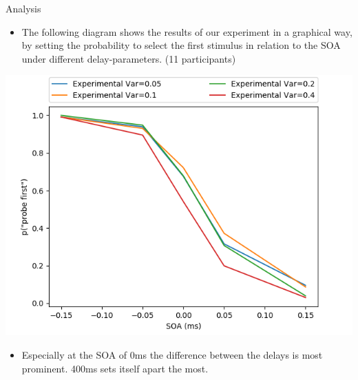 \documentclass[a0paper,portrait]{baposter}
\begin{document}
\begin{poster}
		\begin{posterbox}[name=results,span=1,column=2,row=0]{Analysis}
			\begin{itemize}
				\item The following diagram shows the results of our experiment in a graphical way, by setting the probability to select the first stimulus in relation to the SOA under different delay-parameters. (11 participants)
			\end{itemize}
			\begin{center}
				\includegraphics[width=\textwidth]{imgs/complete_data.png}
			\end{center}
			\begin{itemize}
				\item Especially at the SOA of 0ms the difference between the delays is most prominent. 400ms sets itself apart the most.
			\end{itemize}
			

\end{posterbox}
\end{poster}
\end{document}
